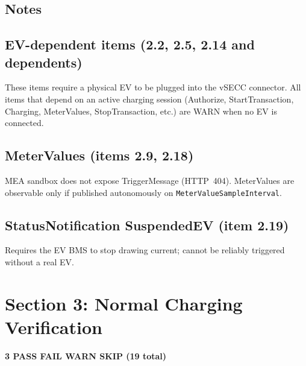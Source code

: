 \documentclass[10pt, a4paper]{article}
\begin{document}
\subsection*{Notes}

\subsection*{EV-dependent items (2.2, 2.5, 2.14 and dependents)}
These items require a physical EV to be plugged into the vSECC connector.
All items that depend on an active charging session (Authorize, StartTransaction,
Charging, MeterValues, StopTransaction, etc.) are WARN when no EV is connected.

\subsection*{MeterValues (items 2.9, 2.18)}
MEA sandbox does not expose TriggerMessage (HTTP~404).
MeterValues are observable only if published autonomously on \texttt{MeterValueSampleInterval}.

\subsection*{StatusNotification SuspendedEV (item 2.19)}
Requires the EV BMS to stop drawing current; cannot be reliably triggered without a real EV.



\newpage
\section{Section 3: Normal Charging Verification}
\textbf{3 PASS  FAIL  WARN  SKIP \quad (19 total)}
\end{document}
